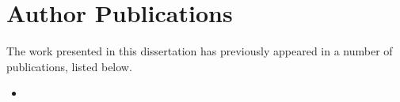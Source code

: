 
\declarationpage



\newpage
\thispagestyle{plain}
\chapter*{Author Publications}

The work presented in this dissertation has previously appeared in a number of publications, listed below.

\begin{itemize}
  \item {}
\end{itemize}

\cleardoublepage
